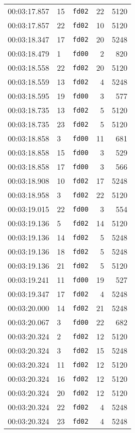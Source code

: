 \documentclass{article}
\begin{document}
\begin{longtable}{lllrr}
00:03:17.857 & 15 & \texttt{fd02} & 22 & 5120 \\
00:03:17.857 & 22 & \texttt{fd02} & 10 & 5120 \\
00:03:18.347 & 17 & \texttt{fd02} & 20 & 5248 \\
00:03:18.479 & 1 & \texttt{fd00} & 2 & 820 \\
00:03:18.558 & 22 & \texttt{fd02} & 20 & 5120 \\
00:03:18.559 & 13 & \texttt{fd02} & 4 & 5248 \\
00:03:18.595 & 19 & \texttt{fd00} & 3 & 577 \\
00:03:18.735 & 13 & \texttt{fd02} & 5 & 5120 \\
00:03:18.735 & 23 & \texttt{fd02} & 5 & 5120 \\
00:03:18.858 & 3 & \texttt{fd00} & 11 & 681 \\
00:03:18.858 & 15 & \texttt{fd00} & 3 & 529 \\
00:03:18.858 & 17 & \texttt{fd00} & 3 & 566 \\
00:03:18.908 & 10 & \texttt{fd02} & 17 & 5248 \\
00:03:18.958 & 3 & \texttt{fd02} & 22 & 5120 \\
00:03:19.015 & 22 & \texttt{fd00} & 3 & 554 \\
00:03:19.136 & 5 & \texttt{fd02} & 14 & 5120 \\
00:03:19.136 & 14 & \texttt{fd02} & 5 & 5248 \\
00:03:19.136 & 18 & \texttt{fd02} & 5 & 5248 \\
00:03:19.136 & 21 & \texttt{fd02} & 5 & 5120 \\
00:03:19.241 & 11 & \texttt{fd00} & 19 & 527 \\
00:03:19.347 & 17 & \texttt{fd02} & 4 & 5248 \\
00:03:20.000 & 14 & \texttt{fd02} & 21 & 5248 \\
00:03:20.067 & 3 & \texttt{fd00} & 22 & 682 \\
00:03:20.324 & 2 & \texttt{fd02} & 12 & 5120 \\
00:03:20.324 & 3 & \texttt{fd02} & 15 & 5248 \\
00:03:20.324 & 11 & \texttt{fd02} & 12 & 5120 \\
00:03:20.324 & 16 & \texttt{fd02} & 12 & 5120 \\
00:03:20.324 & 20 & \texttt{fd02} & 12 & 5120 \\
00:03:20.324 & 22 & \texttt{fd02} & 4 & 5248 \\
00:03:20.324 & 23 & \texttt{fd02} & 4 & 5248 \\

\end{longtable}
\end{document}
